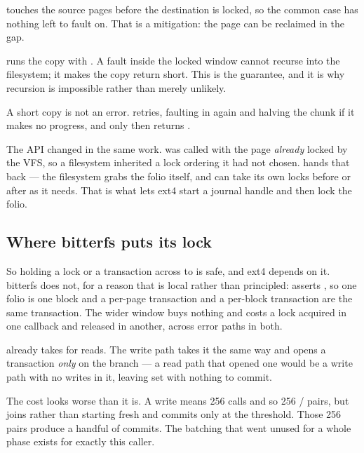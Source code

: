  touches the source pages before the
destination is locked, so the common case has nothing left to fault on. That is a
mitigation: the page can be reclaimed in the gap.

 runs the copy with
. A fault inside the locked window cannot recurse into
the filesystem; it makes the copy return short. This is the guarantee, and it is
why recursion is impossible rather than merely unlikely.

A short copy is not an error.  retries, faulting
in again and halving the chunk if it makes no progress, and only then returns
.

The API changed in the same work.  was called with the page
\emph{already} locked by the VFS, so a filesystem inherited a lock ordering it
had not chosen.  hands that back --- the filesystem grabs the
folio itself, and can take its own locks before or after as it needs. That is
what lets ext4 start a journal handle and then lock the folio.

\subsection{Where bitterfs puts its lock}

So holding a lock or a transaction across  to
 is safe, and ext4 depends on it. bitterfs does not, for a
reason that is local rather than principled: 
asserts , so one folio is one block and a
per-page transaction and a per-block transaction are the same transaction. The
wider window buys nothing and costs a lock acquired in one callback and released
in another, across error paths in both.

 already takes  for reads. The write path
takes it the same way and opens a transaction \emph{only} on the 
branch --- a read path that opened one would be a write path with no writes in
it, leaving  set with nothing to commit.

The cost looks worse than it is. A  write means 256 
calls and so 256 / pairs, but
 joins rather than starting fresh and 
commits only at the threshold. Those 256 pairs produce a handful of commits. The
batching that went unused for a whole phase exists for exactly this caller.


